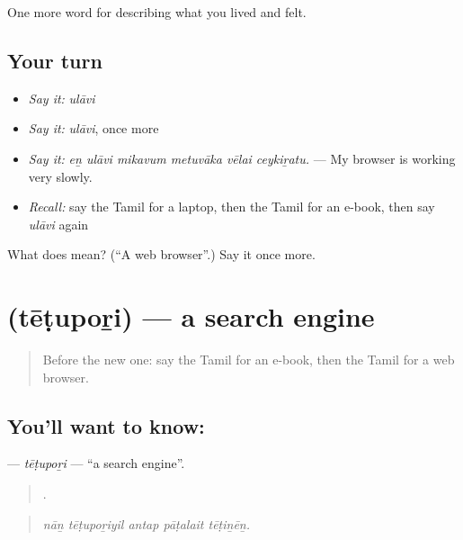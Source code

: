 \begin{grammarlens}[title={What you've built}]
One more word for describing what you lived and felt.
\end{grammarlens}

\subsection*{Your turn}
\begin{itemize}
\raggedright
  \item \emph{Say it:} \emph{ulāvi}
  \item \emph{Say it:} \emph{ulāvi}, once more
  \item \emph{Say it:} \emph{eṉ ulāvi mikavum metuvāka vēlai ceykiṟatu.} — My browser is working very slowly.
  \item \emph{Recall:} say the Tamil for a laptop, then the Tamil for an e-book, then say \emph{ulāvi} again
\end{itemize}

\begin{tcolorbox}[breakable,colback=teal!4,colframe=teal!35!black,title={Before you move on}]
What does  mean? (\textquotedblleft{}A web browser\textquotedblright{}.) Say it once more.
\end{tcolorbox}
\section[\texorpdfstring{\ta{தேடுபொறி} (tēṭupoṟi)}{தேடுபொறி (tēṭupoṟi)}]{ (tēṭupoṟi) — a search engine}

\label{lesson:TA-C516-tetupori}



\begin{quote}
Before the new one: say the Tamil for an e-book, then the Tamil for a web browser.
\end{quote}

\subsection*{You'll want to know: }
\textbf{} — \emph{tēṭupoṟi} — \textquotedblleft{}a search engine\textquotedblright{}.

\begin{quote}
    .
\end{quote}

\begin{quote}
\emph{nāṉ tēṭupoṟiyil antap pāṭalait tēṭiṉēṉ.}
\end{quote}

